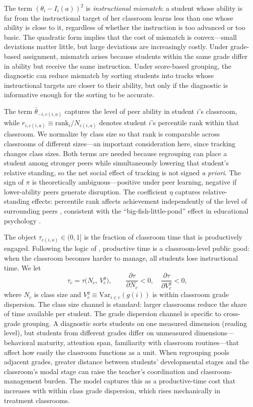 \documentclass[11pt]{article}
\begin{document}
The term $(\theta_i - I_i(a))^2$ is \emph{instructional mismatch}: a student whose ability is far from the instructional target of her classroom learns less than one whose ability is close to it, regardless of whether the instruction is too advanced or too basic. The quadratic form implies that the cost of mismatch is convex---small deviations matter little, but large deviations are increasingly costly. Under grade-based assignment, mismatch arises because students within the same grade differ in ability but receive the same instruction. Under score-based grouping, the diagnostic can reduce mismatch by sorting students into tracks whose instructional targets are closer to their ability, but only if the diagnostic is informative enough for the sorting to be accurate.

The term $\bar{\theta}_{-i,c(i,a)}$ captures the level of peer ability in student $i$'s classroom, while $r_{i,c(i,a)} \equiv \text{rank}_i / N_{c(i,a)}$ denotes student $i$'s percentile rank within that classroom. We normalize by class size so that rank is comparable across classrooms of different sizes---an important consideration here, since tracking changes class sizes. Both terms are needed because regrouping can place a student among stronger peers while simultaneously lowering that student's relative standing, so the net social effect of tracking is not signed \emph{a priori}. The sign of $\pi$ is theoretically ambiguous---positive under peer learning, negative if lower-ability peers generate disruption. The coefficient $\eta$ captures relative-standing effects: percentile rank affects achievement independently of the level of surrounding peers \citep{murphy2020top, elsner2021rank}, consistent with the ``big-fish-little-pond'' effect in educational psychology \citep{hoxby2005taking}.

The object $\tau_{c(i,a)} \in (0, 1]$ is the fraction of classroom time that is productively engaged. Following the logic of \citet{Lazear2001}, productive time is a classroom-level public good: when the classroom becomes harder to manage, all students lose instructional time. We let
\begin{equation}
\label{eq:tau}
\tau_c = \tau\!\big(N_c,\, V^g_c\big), \qquad \frac{\partial\tau}{\partial N_c} < 0, \quad \frac{\partial\tau}{\partial V^g_c} < 0,
\end{equation}
where $N_c$ is class size and $V^g_c \equiv \text{Var}_{i \in c}(g(i))$ is within classroom grade dispersion. The class size channel is standard: larger classrooms reduce the share of time available per student. The grade dispersion channel is specific to cross-grade grouping. A diagnostic sorts students on one measured dimension (reading level), but students from different grades differ on unmeasured dimensions---behavioral maturity, attention span, familiarity with classroom routines---that affect how easily the classroom functions as a unit. When regrouping pools adjacent grades, greater distance between students' developmental stages and the classroom's modal stage can raise the teacher's coordination and classroom-management burden. The model captures this as a productive-time cost that increases with within class grade dispersion, which rises mechanically in treatment classrooms.
\end{document}
